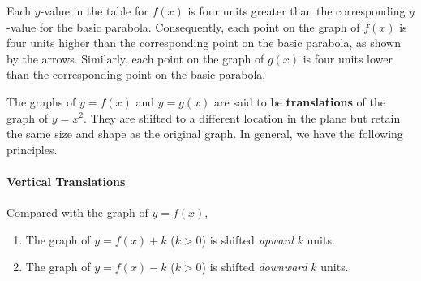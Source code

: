 \documentclass[10pt,]{book}
\newcommand{\terminology}[1]{\textbf{#1}}
\theoremstyle{plain}
\theoremstyle{definition}
\theoremstyle{definition}
\numberwithin{equation}{section}
\newcommand{\gt}{ > }
\begin{document}
    Each \(y\)-value in the table for \(f (x)\) is four units greater than the corresponding \(y\)-value for the basic parabola. Consequently, each point on the graph of \(f (x)\) is four units higher than the corresponding point on the basic parabola, as shown by the arrows. Similarly, each point on the graph of \(g(x)\) is four units lower than the corresponding point on the basic parabola.
%
\par

    The graphs of \(y = f (x)\) and \(y = g(x)\) are said to be \terminology{translations} of the graph of \(y = x^2\). They are shifted to a different location in the plane but retain the same size and shape as the original graph. In general, we have the following principles.
%
\typeout{************************************************}
\typeout{************************************************}
\paragraph[Vertical Translations]{Vertical Translations}\label{paragraphs-26}
%
\par

    Compared with the graph of \(y = f (x)\),
    \leavevmode%
\begin{enumerate}
\item\hypertarget{li-286}{}The graph of \(y=f(x)+k\) (\(k\gt 0\)) is shifted \emph{upward }\(k\) units.\item\hypertarget{li-287}{}The graph of \(y=f(x)-k\) (\(k\gt 0\)) is shifted \emph{downward }\(k\) units.\end{enumerate}
\end{document}
